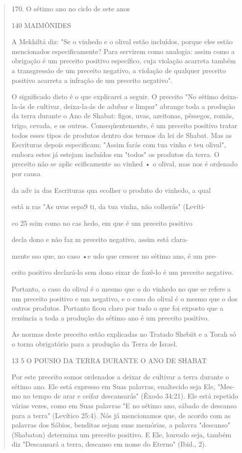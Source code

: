 \begin{quote}
170. O sétimo ano no ciclo de sete anos

140 MAIMÔNIDES

A Mekhiltá diz: "Se o vinhedo e o olival estão incluídos, porque eles
estão mencionados especificamente? Para servirem como analogia: assim
co­mo a obrigação é um preceito positivo específico, cuja violação
acarreta tam­bém a transgressão de um preceito negativo, a violação de
qualquer preceito positivo acarreta a infração de um preceito negativo".

O significado disto é o que explicarei a seguir. O preceito "No séti­mo
deixa-la-ás de cultivar, deixa-la-ás de adubar e limpar" abrange toda a
pro­dução da terra durante o Ano de Shabat: figos, uvas, azeitonas,
pêssegos, ro­mãs, trigo, cevada, e os outros. Conseqüentemente, é um
preceito positivo tra­tar todos esses tipos de produtos dentro dos
termos da lei de Shabat. Mas as Escrituras depois especificam: "Assim
farás com tua vinha e teu olival", embo­ra estes já estejam incluídos em
"todos" os produtos da terra. O preceito não se aplic ecificamente ao
vinhed • o olival, mas nos é ordenado por causa

da adv ia das Escrituras qua ecolher o produto do vinhedo, a qual

está n ras "As uvas sepa9 ti, da tua vinha, não colherás" (Levíti-

co 25 ssim como no cas hedo, em que é um preceito positivo

decla dono e não faz m preceito negativo, assim está clara-

mente sso que, no caso •e udo que crescer no sétimo ano, é um pre-

ceito positivo declará-lo sem dono eixar de fazê-lo é um preceito
negativo.

Portanto, o caso do olival é o mesmo que o do vinhedo no que se refere a
um preceito positivo e um negativo, e o caso do olival é o mesmo que o
dos outros produtos. Portanto ficou claro por tudo o que foi exposto que
a renúncia a toda a produção do sétimo ano é um preceito positivo.

As normas deste preceito estão explicadas no Tratado Shebiit e a To­rah
só o torna obrigatório para a produção da Terra de Israel.

13 5 O POUSIO DA TERRA DURANTE O ANO DE SHABAT

Por este preceito somos ordenados a deixar de cultivar a terra du­rante
o sétimo ano. Ele está expresso em Suas palavras, enaltecido seja Ele,
"Mes­mo no tempo de arar e ceifar descansarás" (Êxodo 34:21). Ele está
repetido vá­rias vezes, como em Suas palavras "E no sétimo ano, sábado
de descanso para a terra" (Levítico 25:4). Nós já mencionamos que, de
acordo com as palavras dos Sábios, benditas sejam suas memórias, a
palavra "descanso" (Shabaton) de­termina um preceito positivo. E Ele,
louvado seja, também diz "Descansará a terra, descanso em nome do
Eterno" (Ibid., 2).


\end{quote}
